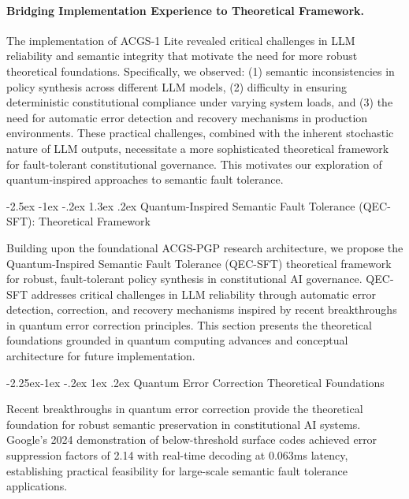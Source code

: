 \documentclass[manuscript,screen,9pt]{acmart}
\makeatletter
\renewcommand\section{\@startsection{section}{1}{\z@}%
  {-2.5ex \@plus -1ex \@minus -.2ex}%
  {1.3ex \@plus.2ex}%
  {\normalfont\Large\bfseries}}
\renewcommand\subsection{\@startsection{subsection}{2}{\z@}%
  {-2.25ex\@plus -1ex \@minus -.2ex}%
  {1ex \@plus .2ex}%
  {\normalfont\large\bfseries}}
\makeatother
\begin{document}
\paragraph{Bridging Implementation Experience to Theoretical Framework.} The implementation of ACGS-1 Lite revealed critical challenges in LLM reliability and semantic integrity that motivate the need for more robust theoretical foundations. Specifically, we observed: (1) semantic inconsistencies in policy synthesis across different LLM models, (2) difficulty in ensuring deterministic constitutional compliance under varying system loads, and (3) the need for automatic error detection and recovery mechanisms in production environments. These practical challenges, combined with the inherent stochastic nature of LLM outputs, necessitate a more sophisticated theoretical framework for fault-tolerant constitutional governance. This motivates our exploration of quantum-inspired approaches to semantic fault tolerance.

\section{Quantum-Inspired Semantic Fault Tolerance (QEC-SFT): Theoretical Framework}
\label{sec:qec_sft}

Building upon the foundational ACGS-PGP research architecture, we propose the Quantum-Inspired Semantic Fault Tolerance (QEC-SFT) theoretical framework for robust, fault-tolerant policy synthesis in constitutional AI governance. QEC-SFT addresses critical challenges in LLM reliability through automatic error detection, correction, and recovery mechanisms inspired by recent breakthroughs in quantum error correction principles. This section presents the theoretical foundations grounded in quantum computing advances and conceptual architecture for future implementation.

\subsection{Quantum Error Correction Theoretical Foundations}
\label{subsec:qec_foundations}

Recent breakthroughs in quantum error correction provide the theoretical foundation for robust semantic preservation in constitutional AI systems. Google's 2024 demonstration of below-threshold surface codes \cite{Acharya2024QuantumErrorCorrection} achieved error suppression factors of 2.14 with real-time decoding at 0.063ms latency, establishing practical feasibility for large-scale semantic fault tolerance applications.
\end{document}
